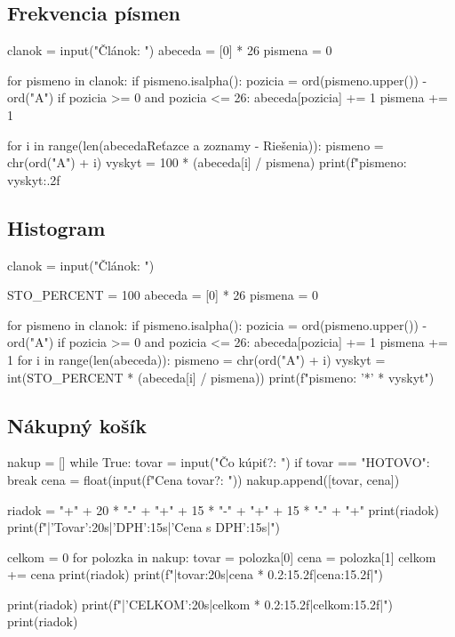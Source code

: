 \subsection{Frekvencia písmen}
\begin{solution}
clanok = input("Článok: ")
abeceda = [0] * 26
pismena = 0

for pismeno in clanok:
    if pismeno.isalpha():
        pozicia = ord(pismeno.upper()) - ord("A")
        if pozicia >= 0 and pozicia <= 26:
            abeceda[pozicia] += 1
            pismena += 1

for i in range(len(abecedaReťazce a zoznamy - Riešenia)):
    pismeno = chr(ord("A") + i)
    vyskyt = 100 * (abeceda[i] / pismena)
    print(f"{pismeno}: {vyskyt:.2f}%
\end{solution}

\subsection{Histogram}
\begin{solution}
clanok = input("Článok: ")

STO_PERCENT = 100
abeceda = [0] * 26
pismena = 0

for pismeno in clanok:
    if pismeno.isalpha():
        pozicia = ord(pismeno.upper()) - ord("A")
        if pozicia >= 0 and pozicia <= 26:
            abeceda[pozicia] += 1
            pismena += 1
for i in range(len(abeceda)):
	pismeno = chr(ord("A") + i)
	vyskyt = int(STO_PERCENT * (abeceda[i] / pismena))
	print(f"{pismeno}: {'*' * vyskyt}")
\end{solution}

\subsection{Nákupný košík}
\begin{solution}
nakup = []
while True:
    tovar = input("Čo kúpiť?: ")
    if tovar == "HOTOVO":
        break
    cena = float(input(f"Cena {tovar}?: "))
    nakup.append([tovar, cena])

riadok = "+" + 20 * "-" + "+" + 15 * "-" + "+" + 15 * "-" + "+"
print(riadok)
print(f"|{'Tovar':20s}|{'DPH':15s}|{'Cena s DPH':15s}|")

celkom = 0
for polozka in nakup:
    tovar = polozka[0]
    cena = polozka[1]
    celkom += cena
    print(riadok)
    print(f"|{tovar:20s}|{cena * 0.2:15.2f}|{cena:15.2f}|")

print(riadok)
print(f"|{'CELKOM':20s}|{celkom * 0.2:15.2f}|{celkom:15.2f}|")
print(riadok)
\end{solution}


